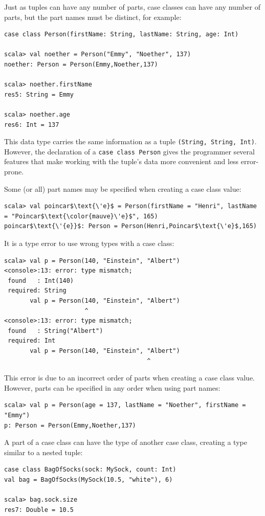 Just as tuples can have any number of parts, case classes can have
any number of parts, but the part names must be distinct, for example:
\begin{lstlisting}
case class Person(firstName: String, lastName: String, age: Int)

scala> val noether = Person("Emmy", "Noether", 137)
noether: Person = Person(Emmy,Noether,137)

scala> noether.firstName
res5: String = Emmy

scala> noether.age
res6: Int = 137
\end{lstlisting}
This data type carries the same information as a tuple \lstinline!(String, String, Int)!.
However, the declaration of a \lstinline!case class Person! gives
the programmer several features that make working with the tuple\textsf{'}s
data more convenient and less error-prone.

Some (or all) part names may be specified when creating a case class
value:
\begin{lstlisting}[extendedchars=true,mathescape=true]
scala> val poincar$\text{\'e}$ = Person(firstName = "Henri", lastName = "Poincar$\text{\color{mauve}\'e}$", 165)
poincar$\text{\'{e}}$: Person = Person(Henri,Poincar$\text{\'e}$,165)
\end{lstlisting}
It is a type error to use wrong types with a case class:
\begin{lstlisting}
scala> val p = Person(140, "Einstein", "Albert")
<console>:13: error: type mismatch;
 found   : Int(140)
 required: String
       val p = Person(140, "Einstein", "Albert")
                      ^
<console>:13: error: type mismatch;
 found   : String("Albert")
 required: Int
       val p = Person(140, "Einstein", "Albert")
                                       ^
\end{lstlisting}
This error is due to an incorrect order of parts when creating a case
class value. However, parts can be specified in any order when using
part names:
\begin{lstlisting}
scala> val p = Person(age = 137, lastName = "Noether", firstName = "Emmy")
p: Person = Person(Emmy,Noether,137)
\end{lstlisting}
A part of a case class can have the type of another case class, creating
a type similar to a nested tuple:
\begin{lstlisting}
case class BagOfSocks(sock: MySock, count: Int)
val bag = BagOfSocks(MySock(10.5, "white"), 6)

scala> bag.sock.size
res7: Double = 10.5
\end{lstlisting}


